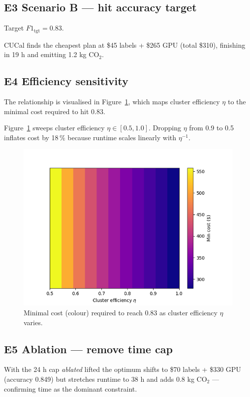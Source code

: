 \documentclass[11pt]{article}
\begin{document}
\subsection{E3 Scenario B — hit accuracy target}
Target \(F1_\text{tgt}=0.83\).

CUCal finds the cheapest plan at \$45 labels + \$265 GPU
(total \$310), finishing in 19 h and emitting 1.2 kg CO\(_2\).

\subsection{E4 Efficiency sensitivity}

The relationship is visualised in Figure~\ref{fig:heatmap}, which maps
cluster efficiency $\eta$ to the minimal cost required to hit
\SI{0.83}{\fOneScore}.

Figure~\ref{fig:heatmap} sweeps cluster efficiency
\(\eta\in[0.5,1.0]\).  
Dropping \(\eta\) from 0.9 to 0.5 inflates cost by 18\,\% because
runtime scales linearly with $\eta^{-1}$.

\begin{figure}[htbp]
  \centering
  \includegraphics[width=.78\linewidth]{figures/heatmap_eff.png}
  \caption{Minimal cost (colour) required to reach \SI{0.83}{\fOneScore} as cluster efficiency $\eta$ varies.}
  \label{fig:heatmap}
\end{figure}

\subsection{E5 Ablation — remove time cap}
With the 24 h cap \emph{ablated} lifted the optimum shifts to
\$70 labels + \$330 GPU (accuracy 0.849) but stretches runtime
to 38 h and adds 0.8 kg CO\(_2\) — confirming time as the
dominant constraint.
\end{document}
